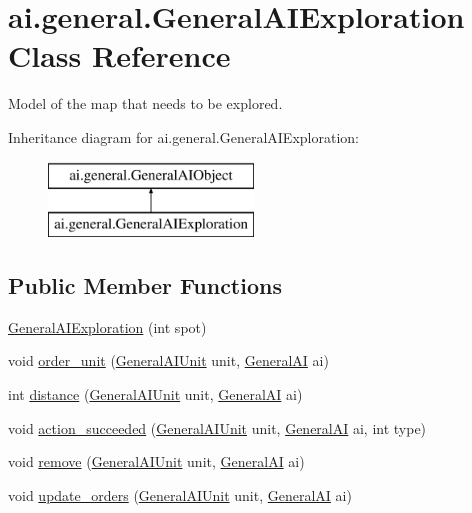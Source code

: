 \hypertarget{classai_1_1general_1_1_general_a_i_exploration}{
\section{ai.general.GeneralAIExploration Class Reference}
\label{classai_1_1general_1_1_general_a_i_exploration}
}


Model of the map that needs to be explored.  


Inheritance diagram for ai.general.GeneralAIExploration:\begin{figure}[H]
\begin{center}
\leavevmode
\includegraphics[height=2.000000cm]{classai_1_1general_1_1_general_a_i_exploration}
\end{center}
\end{figure}
\subsection*{Public Member Functions}
\begin{DoxyCompactItemize}
\item 
\hyperlink{classai_1_1general_1_1_general_a_i_exploration_a8383f2b32ee20b1ea37f47de717d6d07}{GeneralAIExploration} (int spot)
\item 
void \hyperlink{classai_1_1general_1_1_general_a_i_exploration_ae10885edd55c17722d32d198e2bcf93f}{order\_\-unit} (\hyperlink{classai_1_1general_1_1_general_a_i_unit}{GeneralAIUnit} unit, \hyperlink{classai_1_1general_1_1_general_a_i}{GeneralAI} ai)
\item 
int \hyperlink{classai_1_1general_1_1_general_a_i_exploration_a5e6d8e8dffaa861c94f89ae91592f4af}{distance} (\hyperlink{classai_1_1general_1_1_general_a_i_unit}{GeneralAIUnit} unit, \hyperlink{classai_1_1general_1_1_general_a_i}{GeneralAI} ai)
\item 
void \hyperlink{classai_1_1general_1_1_general_a_i_exploration_ac0656aff8a8e64071581a69c20231d3b}{action\_\-succeeded} (\hyperlink{classai_1_1general_1_1_general_a_i_unit}{GeneralAIUnit} unit, \hyperlink{classai_1_1general_1_1_general_a_i}{GeneralAI} ai, int type)
\item 
void \hyperlink{classai_1_1general_1_1_general_a_i_exploration_afda46ba60d3ad8b6c7447c031db284cf}{remove} (\hyperlink{classai_1_1general_1_1_general_a_i_unit}{GeneralAIUnit} unit, \hyperlink{classai_1_1general_1_1_general_a_i}{GeneralAI} ai)
\item 
void \hyperlink{classai_1_1general_1_1_general_a_i_exploration_a988a511aa307a340e4052518190340b8}{update\_\-orders} (\hyperlink{classai_1_1general_1_1_general_a_i_unit}{GeneralAIUnit} unit, \hyperlink{classai_1_1general_1_1_general_a_i}{GeneralAI} ai)
\end{DoxyCompactItemize}
